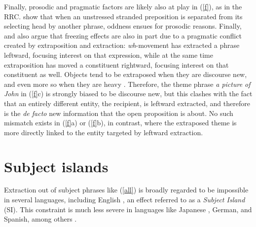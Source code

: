 \documentclass[output=paper
	        ,collection
	        ,collectionchapter
 	        ,biblatex
                ,babelshorthands
                ,newtxmath
                ,draftmode
                ,colorlinks, citecolor=brown
]{langscibook}
\begin{document}
 Finally, prosodic and pragmatic factors are likely also at  play in (\ref{f}), as in the RRC. \citet{huck} show that when an unstressed stranded preposition  is separated from its selecting head by another phrase, oddness ensues for prosodic reasons.  Finally,  \citet{huck} and  \citet{boling92} also
 argue that freezing effects are also in part due to a pragmatic conflict created by extraposition and extraction: \emph{wh}-movement has extracted a phrase leftward, focusing interest on that expression, while at the same time extraposition has moved a constituent rightward,  focusing interest on that constituent as well.  
Objects tend to be extraposed when they are discourse new, and even more so when they are heavy \citep[71]{wasowbook}. Therefore, the theme phrase \emph{a picture of John} in (\ref{f}c) is strongly biased to be discourse new,  but this clashes with the fact that an entirely different entity, the recipient, is leftward extracted, and therefore is the \emph{de facto} new information that the open proposition is about.  No such mismatch exists in (\ref{f}a) or (\ref{f}b), in contrast, where the extraposed theme is more directly linked to the  entity targeted by leftward extraction.


\section{Subject islands}

Extraction out of subject phrases like (\ref{all}) 
is broadly regarded to be impossible in several languages, including
English \citep{Ross67,chomsky73}, an effect referred to as a \emph{Subject Island} (SI).
This constraint is  much less severe  in languages like Japanese , German, and Spanish,
among others \citep{stepanov,jurkaetal,goodall11,greco,fukuda,polinsky13}. 


\eal \label{all}




\zl
\end{document}
